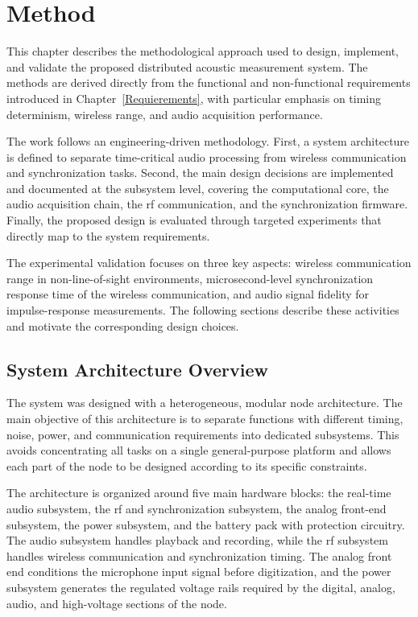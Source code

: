 
\chapter{Method}\label{chap:method}



This chapter describes the methodological approach used to design, implement, and validate the proposed distributed acoustic measurement system. The methods are derived directly from the functional and non-functional requirements introduced in Chapter~\ref{Requierements}, with particular emphasis on timing determinism, wireless range, and audio acquisition performance.

The work follows an engineering-driven methodology. First, a system architecture is defined to separate time-critical audio processing from wireless communication and synchronization tasks. Second, the main design decisions are implemented and documented at the subsystem level, covering the computational core, the audio acquisition chain, the \acrshort{rf} communication, and the synchronization firmware. Finally, the proposed design is evaluated through targeted experiments that directly map to the system requirements.

The experimental validation focuses on three key aspects: wireless communication range in non-line-of-sight environments, microsecond-level synchronization response time of the wireless communication, and audio signal fidelity for impulse-response measurements. The following sections describe these activities and motivate the corresponding
design choices.

\section{System Architecture Overview} \label{sec:system_architecture_overview}

The system was designed with a heterogeneous, modular node architecture. The main objective of this architecture is to separate functions with different timing, noise, power, and communication requirements into dedicated subsystems. This avoids concentrating all tasks on a single general-purpose platform and allows each part of the node to be designed according to its specific constraints.

The architecture is organized around five main hardware blocks: the real-time audio subsystem, the \acrshort{rf} and synchronization subsystem, the analog front-end subsystem, the power subsystem, and the battery pack with protection circuitry. The audio subsystem handles playback and recording, while the \acrshort{rf} subsystem handles wireless communication and synchronization timing. The analog front end conditions the microphone input signal before digitization, and the power subsystem generates the regulated voltage rails required by the digital, analog, audio, and high-voltage sections of the node.


